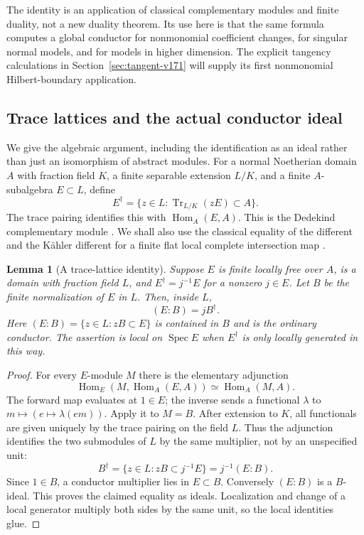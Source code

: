 \documentclass[11pt,reqno]{amsart}
\numberwithin{equation}{section}
\newtheorem{lemma}[theorem]{Lemma}
\theoremstyle{definition}\newtheorem{definition}[theorem]{Definition}
\theoremstyle{remark}\newtheorem{remark}[theorem]{Remark}
\begin{document}
The identity is an application of classical complementary modules and
finite duality, not a new duality theorem. Its use here is that the same
formula computes a global conductor for nonmonomial coefficient changes,
for singular normal models, and for models in higher dimension. The
explicit tangency calculations in Section~\ref{sec:tangent-v171} will
supply its first nonmonomial Hilbert-boundary application.

\subsection{Trace lattices and the actual conductor ideal}
We give the algebraic argument, including the identification as an ideal
rather than just an isomorphism of abstract modules. For a normal
Noetherian domain $A$ with fraction field $K$, a finite separable
extension $L/K$, and a finite $A$-subalgebra $E\subset L$, define
\[
 E^\dagger=\{z\in L:\operatorname{Tr}_{L/K}(zE)\subset A\}.
\]
The trace pairing identifies this with $\operatorname{Hom}_A(E,A)$.
This is the Dedekind complementary module
\cite[Section 49.8]{Stacks171}. We shall also use the classical equality
of the different and the K\"ahler different for a finite flat local
complete intersection map \cite[Section 49.12]{Stacks171}.

\begin{lemma}[A trace-lattice identity]\label{lem:trace-lattice-v171}
Suppose $E$ is finite locally free over $A$, is a domain with fraction
field $L$, and $E^\dagger=j^{-1}E$ for a nonzero $j\in E$.
Let $B$ be the finite normalization of $E$ in $L$. Then, inside $L$,
\begin{equation}\label{eq:trace-conductor-v171}
 (E:B)=jB^\dagger.
\end{equation}
Here $(E:B)=\{z\in L:zB\subset E\}$ is contained in $B$ and is the
ordinary conductor. The assertion is local on $\operatorname{Spec}E$
when $E^\dagger$ is only locally generated in this way.
\end{lemma}
\begin{proof}
For every $E$-module $M$ there is the elementary adjunction
\[
 \operatorname{Hom}_E(M,\operatorname{Hom}_A(E,A))
 \simeq\operatorname{Hom}_A(M,A).
\]
The forward map evaluates at $1\in E$; the inverse sends a functional
$\lambda$ to $m\mapsto(e\mapsto\lambda(em))$. Apply it to $M=B$.
After extension to $K$, all functionals are given uniquely by the trace
pairing on the field $L$. Thus the adjunction identifies the two
submodules of $L$ by the same multiplier, not by an unspecified unit:
\[
 B^\dagger
 =\{z\in L:zB\subset j^{-1}E\}
 =j^{-1}(E:B).
\]
Since $1\in B$, a conductor multiplier lies in $E\subset B$. Conversely
$(E:B)$ is a $B$-ideal. This proves the claimed equality as ideals.
Localization and change of a local generator multiply both sides by
the same unit, so the local identities glue.
\end{proof}
\end{document}
